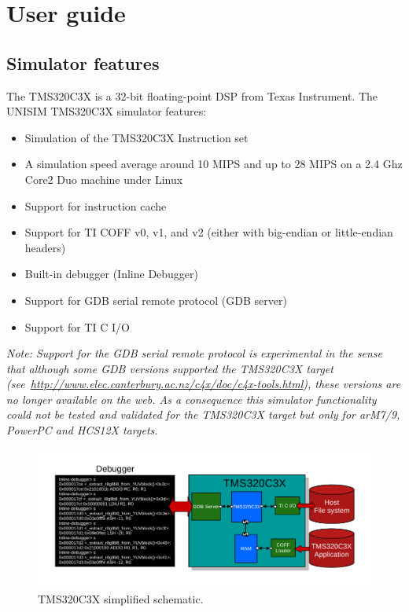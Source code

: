 \section{User guide}

\subsection{Simulator features}

The TMS320C3X is a 32-bit floating-point DSP from Texas Instrument.
The UNISIM TMS320C3X simulator features:
\begin{itemize}
\item Simulation of the TMS320C3X Instruction set
\item A simulation speed average around 10 MIPS and up to 28 MIPS on a 2.4 Ghz Core2 Duo machine under Linux
\item Support for instruction cache
\item Support for TI COFF v0, v1, and v2 (either with big-endian or little-endian headers)
\item Built-in debugger (Inline Debugger)
\item Support for GDB serial remote protocol (GDB server)
\item Support for TI C I/O
\end{itemize}

\textit{Note: Support for the GDB serial remote protocol is experimental in the sense that although some GDB versions supported the TMS320C3X target (see~\url{http://www.elec.canterbury.ac.nz/c4x/doc/c4x-tools.html}), these versions are no longer available on the web. As a consequence this simulator functionality could not be tested and validated for the TMS320C3X target but only for arM7/9, PowerPC and HCS12X targets.}

\begin{figure}[!h]
	\begin{center}
		\includegraphics[width=\textwidth]{tms320c3x/fig_tms320c3x.pdf}
	\end{center}
	\caption{TMS320C3X simplified schematic.}
	\label{fig:tms320c3x}
\end{figure}

